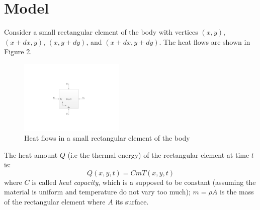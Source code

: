 \documentclass[11pt]{article}
\begin{document}
\section{Model}
Consider a small rectangular element of the body with vertices $(x,y)$, $(x+dx,y)$, $(x, y+dy)$, and $(x+dx, y+dy)$. The heat flows are shown in Figure 2.
\begin{figure}[htb]
	\centering
	\includegraphics[width=5cm]{fig2.pdf}       
	\caption{Heat flows in a small rectangular element of the body}
\end{figure}

\noindent The heat amount $Q$ (i.e the thermal energy) of the rectangular element at time $t$ is: 
\begin{equation}
Q(x,y,t)=C m T(x,y,t)
\end{equation}
where $C$ is called \emph{heat capacity}, which is a supposed to be constant (assuming the material is uniform and temperature do not vary too much); $m = \rho A$ is the mass of the rectangular element where $A$ its surface.
\end{document}
